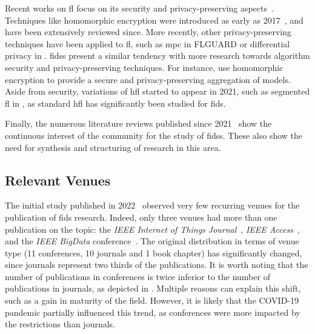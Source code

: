 Recent works on \gls{fl} focus on its security and privacy-preserving aspects~\cite{nguyen_PoisoningAttacksFederated_2020b,lyu_ThreatsFederatedLearning_2020,mothukuri_surveysecurityprivacy_2021}.
Techniques like homomorphic encryption were introduced as early as 2017~\cite{hardy_Privatefederatedlearning_2017}, and have been extensively reviewed since.
More recently, other privacy-preserving techniques have been applied to \gls{fl}, such as \gls{mpc} in FLGUARD
\cite{nguyen_FLGUARDSecurePrivate_2021} or differential privacy in \cite{kim_FederatedLearningLocal_2021}.
\Glspl{fids} present a similar tendency with more research towards algorithm security and privacy-preserving techniques.
For instance, \textcite{li_DeepFedFederatedDeep_2020} use homomorphic encryption to provide a secure and privacy-preserving aggregation of models.
Aside from security, variations of \gls{hfl} started to appear in 2021, such as segmented \gls{fl} in
\cite{sun_AdaptiveFederatedLearning_2020}, as standard \gls{hfl} has significantly been studied for \gls{fids}.

Finally, the numerous literature reviews published since 2021~\cite{agrawal_FederatedLearningintrusion_2022,alazab_FederatedLearningCybersecurity_2021,campos_EvaluatingFederatedLearning_2022,lavaur_EvolutionFederatedLearningbased_2022,fedorchenko_ComparativeReviewIntrusion_2022,ghimire_RecentAdvancesFederated_2022,ismaila_ReviewApproachesFederated_2024} show the
continuous interest of the community for the study of \glspl{fids}.
These also show the need for synthesis and structuring of research in this area.


\subsection{Relevant Venues\label{sec:sota.quanti.venues}}

The initial study published in 2022~\cite{lavaur_EvolutionFederatedLearningbased_2022} observed very few recurring venues for the publication of \gls{fids} research.
Indeed, only three venues had more than one publication on the topic: the \emph{IEEE Internet of Things Journal}~\cite{popoola_FederatedDeepLearning_2021,zhang_BlockchainbasedFederatedLearning_2020}, \emph{IEEE
Access}~\cite{chen_IntrusionDetectionWireless_2020,li_DistributedNetworkIntrusion_2020}, and the \emph{IEEE BigData} conference~\cite{cetin_FederatedWirelessNetwork_2019,fan_IoTDefenderFederatedTransfer_2020}.
The original distribution in terms of venue type (11 conferences, 10 journals and 1 book chapter) has significantly changed, since journals represent two thirds of the publications.
It is worth noting that the number of publications in conferences is twice inferior to the number of publications in journals, as depicted in .
Multiple reasons can explain this shift, such as a gain in maturity of the field.
However, it is likely that the COVID-19 pandemic partially influenced this trend, as conferences were more impacted by the restrictions than journals.

